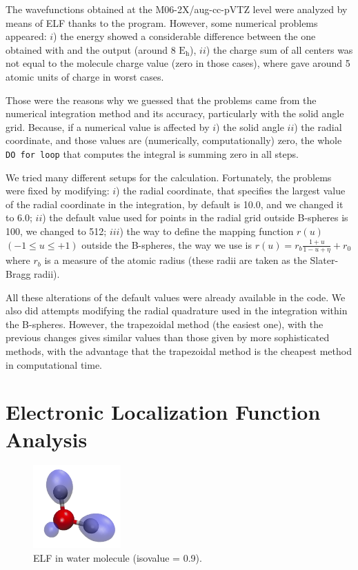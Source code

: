 The wavefunctions obtained at the M06-2X/aug-cc-pVTZ level were analyzed
by means of ELF thanks to the {} program.
However, some numerical problems appeared: $i$) the energy
showed a considerable difference between the one obtained with
{} and the {} output (around 8 $\mathrm{E_h}$), $ii$)
the charge sum of all centers was not equal to the molecule charge value (zero
in those cases), where {} gave around 5 atomic units of charge in
worst cases.

Those were the reasons why we guessed that the problems came from the numerical
integration method and its accuracy, particularly with the solid angle grid. Because,
if a numerical value is affected by $i$) the solid angle $ii$) the radial coordinate,
and those values are (numerically, computationally) zero, the whole \texttt{DO for loop} that
computes the integral is summing zero in all steps.

We tried many different setups for the calculation.
Fortunately, the problems were fixed by modifying:
$i$)
the radial coordinate, that specifies the largest value of the radial
coordinate in the integration, by default is 10.0, and we changed it to 6.0;
$ii$)
the default value used for points in the radial grid outside B-spheres is 100,
we changed to 512;
$iii$)
the way to define the mapping
function $ r(u) $ $( -1 \leqslant u
\leqslant +1 )$ outside the B-spheres, the way we use is $ r(u) = r_b
\frac{1+u}{1 - u +\eta} + r_0 $ where $r_b$ is a measure of the atomic radius
(these radii are taken as the Slater-Bragg radii).

All these alterations of the default values were already available in the code.
We also did attempts modifying the radial quadrature used in the integration
within the B-spheres. However, the trapezoidal method (the easiest one), with
the previous changes gives similar values than those given by more
sophisticated methods, with the advantage that the trapezoidal method is the
cheapest method in computational time.


\section{Electronic Localization Function Analysis}

\begin{figure} %
    \centering
    \includegraphics[width=0.3\textwidth]{4/plots/elf/new/waterELF.png}
    \caption{ELF in water molecule (isovalue = 0.9).}
    \label{awa}
\end{figure}

